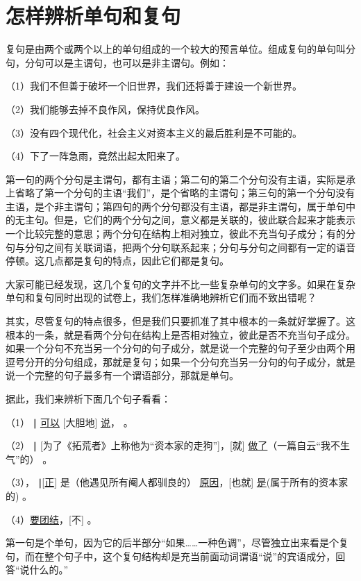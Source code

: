 \section{怎样辨析单句和复句}
复句是由两个或两个以上的单句组成的一个较大的预言单位。组成复句的单句叫分句，分句可以是主谓句，也可以是非主谓句。例如：

（1）我们不但善于破坏一个旧世界，我们还将善于建设一个新世界。

（2）我们能够去掉不良作风，保持优良作风。

（3）没有四个现代化，社会主义对资本主义的最后胜利是不可能的。

（4）下了一阵急雨，竟然出起太阳来了。

第一句的两个分句是主谓句，都有主语；第二句的第二个分句没有主语，实际是承上省略了第一个分句的主语“我们”，是个省略的主谓句；第三句的第一个分句没有主语，是个非主谓句；第四句的两个分句都没有主语，都是非主谓句，属于单句中的无主句。但是，它们的两个分句之间，意义都是关联的，彼此联合起来才能表示一个比较完整的意思；两个分句在结构上相对独立，彼此不充当句子成分；有的分句与分句之间有关联词语，把两个分句联系起来；分句与分句之间都有一定的语音停顿。这几点都是复句的特点，因此它们都是复句。

大家可能已经发现，这几个复句的文字并不比一些复杂单句的文字多。如果在复杂单句和复句同时出现的试卷上，我们怎样准确地辨析它们而不致出错呢？

其实，尽管复句的特点很多，但是我们只要抓准了其中根本的一条就好掌握了。这根本的一条，就是看两个分句在结构上是否相对独立，彼此是否不充当句子成分。如果一个分句不充当另一个分句的句子成分，就是说一个完整的句子至少由两个用逗号分开的分句组成，那就是复句；如果一个分句充当另一分句的句子成分，就是说一个完整的句子最多有一个谓语部分，那就是单句。

据此，我们来辨析下面几个句子看看：

（1）
$\Vert$
\uline{可以}
[大胆地]
\uline{说}，
。

（2）
$\Vert$ [为了《拓荒者》上称他为“资本家的走狗”]，[就]
\uline{做了}（一篇自云“我不生气”的）
。

（3），
$\Vert$[\uline{正}]
是（他遇见所有阉人都驯良的）
\uline{原因}，[也就]
\uline{是}(属于所有的资本家的)
。

（4）\uline{要团结}，[不]
。

第一句是个单句，因为它的后半部分“如果……一种色调”，尽管独立出来看是个复句，而在整个句子中，这个复句结构却是充当前面动词谓语“说”的宾语成分，回答“说什么的。”

